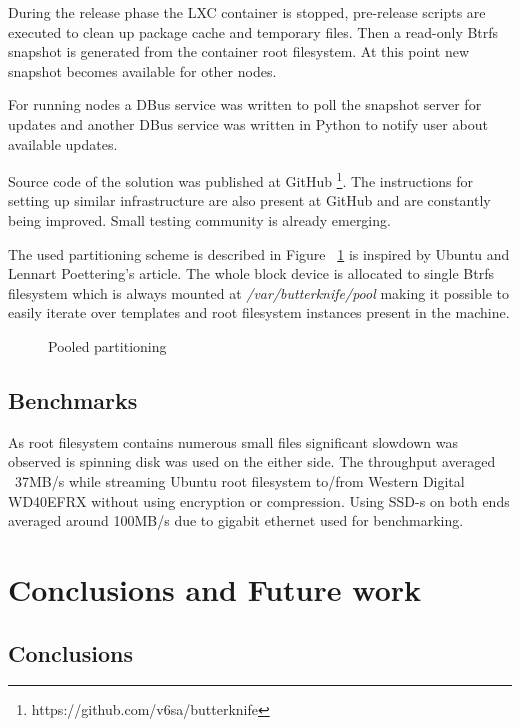 \documentclass{article}
\begin{document}
During the release phase the LXC container is stopped, pre-release
scripts are executed to clean up package cache and temporary files.
Then a read-only Btrfs snapshot is generated from the container root filesystem.
At this point new snapshot becomes available for other nodes.



For running nodes a DBus service was written to poll the snapshot server
for updates and another DBus service was written in Python to notify user
about available updates.

Source code of the solution was published at GitHub
\footnote{https://github.com/v6sa/butterknife}.
The instructions for setting up similar infrastructure
are also present at GitHub and are constantly being improved.
Small testing community is already emerging.



The used partitioning scheme is described in Figure ~\ref{fig:pooled-partitioning}
is inspired by Ubuntu and Lennart Poettering's article.
The whole block device is allocated to single Btrfs filesystem
which is always mounted at \emph{/var/butterknife/pool} making
it possible to easily iterate over templates and root filesystem instances
present in the machine.

\begin{figure}[!htb]
\centering
\scalebox{0.5}{}
\caption{Pooled partitioning}
\label{fig:pooled-partitioning}
\end{figure}


\subsection{Benchmarks}

As root filesystem contains numerous small files significant
slowdown was observed is spinning disk was used on the either
side.
The throughput averaged ~37MB/s while
streaming Ubuntu root filesystem to/from
Western Digital WD40EFRX without using encryption or compression.
Using SSD-s on both ends averaged around 100MB/s
due to gigabit ethernet used for benchmarking.


\section{Conclusions and Future work}

\subsection{Conclusions}
\end{document}
